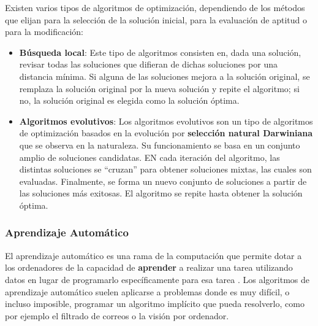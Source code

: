Existen varios tipos de algoritmos de optimización, dependiendo de los métodos que elijan para la selección de la solución inicial, para la evaluación de aptitud o para la modificación:
\begin{itemize}
\item \textbf{Búsqueda local}: Este tipo de algoritmos consisten en, dada una solución, revisar todas las soluciones que difieran de dichas soluciones por una distancia mínima. Si alguna de las soluciones mejora a la solución original, se remplaza la solución original por la nueva solución y repite el algoritmo; si no, la solución original es elegida como la solución óptima.
\item \textbf{Algoritmos evolutivos}: Los algoritmos evolutivos son un tipo de algoritmos de optimización basados en la evolución por \textbf{selección natural Darwiniana} que se observa en la naturaleza. Su funcionamiento se basa en un conjunto amplio de soluciones candidatas. EN cada iteración del algoritmo, las distintas soluciones se ``cruzan'' para obtener soluciones mixtas, las cuales son evaluadas. Finalmente, se forma un nuevo conjunto de soluciones a partir de las soluciones más exitosas. El algoritmo se repite hasta obtener la solución óptima.
\end{itemize} 

\subsubsection{Aprendizaje Automático}
El aprendizaje automático es una rama de la computación que permite dotar a los ordenadores de la capacidad de \textbf{aprender} a realizar una tarea utilizando datos en lugar de programarlo específicamente para esa tarea \cite{machine_learning}. Los algoritmos de aprendizaje automático suelen aplicarse a problemas donde es muy difícil, o incluso imposible, programar un algoritmo implícito que pueda resolverlo, como por ejemplo el filtrado de correos o la visión por ordenador.

